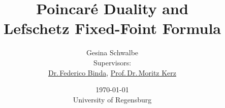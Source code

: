 \documentclass[english,headsepline=0.25pt]{scrartcl}
\theoremstyle{definition}
\theoremstyle{remark}
\begin{document}
\clearpairofpagestyles
{}
\cfoot*{\pagemark}

\title{Poincaré Duality and\\
  Lefschetz Fixed-Foint Formula}
\subject{Seminar:
  Deligne's proof of the Weil Conjecture%
}
\author{Gesina Schwalbe\\
  \normalsize
  Supervisors:\\\normalsize
  \href{https://fedebinda.wordpress.com}{Dr.\,Federico Binda}, 
  \href{http://www.mathematik.uni-regensburg.de/kerz/}{Prof.\,Dr.\,Moritz Kerz}
}
\date{\normalsize\today\\
  University of Regensburg\\
}
\maketitle
\tableofcontents
\end{document}
